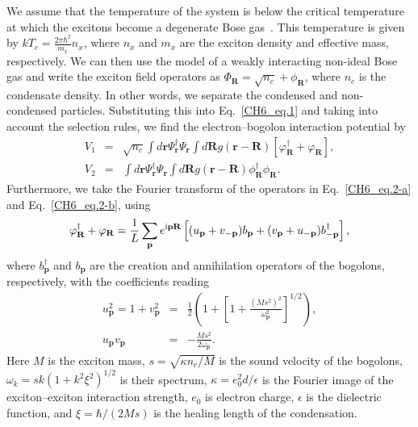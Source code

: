 We assume that the temperature of the system is below the critical temperature at which the excitons become a degenerate Bose gas~\cite{Fogler:2014aa}. This temperature is given by $kT_c =\frac{2\pi\hbar^2}{m_x}n_x$, where $n_x$ and $m_x$ are the exciton density and effective mass, respectively.
We can then use the model of a weakly interacting non-ideal Bose gas and write the exciton field operators as $\Phi_\mathbf{R}=\sqrt{n_c}+\phi_\mathbf{R}$, where $n_c$ is the condensate density.
In other words, we separate the condensed and non-condensed particles.
%
Substituting this into Eq.~\eqref{CH6_eq.1} and taking into account the selection rules, we find the electron--bogolon interaction potential by
%
\begin{eqnarray}
V_1 &=& \sqrt{n_c}\int d\mathbf{r}\Psi^\dag_\mathbf{r}\Psi_\mathbf{r} \int d\mathbf{R}g\left(\mathbf{r}-\mathbf{R}\right)\left[\varphi^\dag_\mathbf{R}+\varphi_\mathbf{R}\right],\label{CH6_eq.2-a} \\
V_2 &=& \int d\mathbf{r} \Psi^\dagger_\mathbf{r} \Psi_\mathbf{r} \int d\mathbf{R} g\left(\mathbf{r}-\mathbf{R}\right) \phi^\dagger_\mathbf{R} \phi_\mathbf{R}. \label{CH6_eq.2-b}
\end{eqnarray}
%
Furthermore, we take the Fourier transform of the operators in Eq.~\eqref{CH6_eq.2-a} and Eq.~\eqref{CH6_eq.2-b}, using
%
\begin{equation}\label{CH6_eq.3}
    \varphi^\dag_\mathbf{R}+\varphi_\mathbf{R}= \frac{1}{L}\sum_{\mathbf{p}} e^{\mathrm{i}\mathbf{pR}} \left[(u_\mathbf{p}+v_{-\mathbf{p}})b_\mathbf{p}+(v_\mathbf{p}+u_{-\mathbf{p}})b^\dag_{-\mathbf{p}}\right],
\end{equation}
%
where $b^\dag_{\mathbf{p}}$ and $b_{\mathbf{p}}$ are the creation and annihilation operators of the bogolons, respectively, with the coefficients reading~\cite{Giorgini:1998aa}
%
\begin{eqnarray}\label{CH6_eq.4}
    u^2_{\mathbf{p}}=1+v^2_{\mathbf{p}}&=&\frac{1}{2}\left(1+\left[1+\frac{(Ms^2)^2}{\omega^2_{\mathbf{p}}}\right]^{1/2}\right),\\\nonumber
    u_{\mathbf{p}}v_{\mathbf{p}}&=&-\frac{Ms^2}{2\omega_{\mathbf{p}}}.
\end{eqnarray}
%
Here $M$ is the exciton mass, $s=\sqrt{\kappa n_c/M}$ is the sound velocity of the bogolons,
$\omega_k=sk(1+k^2\xi^2)^{1/2}$ is their spectrum, $\kappa=e_0^2d/\epsilon$ is the Fourier image of the exciton--exciton interaction strength, $e_0$ is electron charge, $\epsilon$ is the dielectric function, and $\xi=\hbar/(2Ms)$ is the healing length of the condensation.
